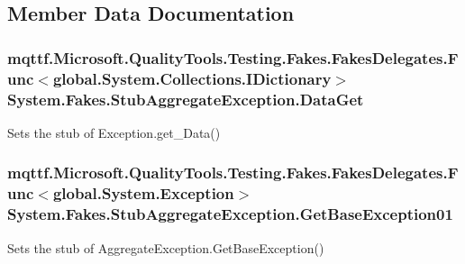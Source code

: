 \subsection{Member Data Documentation}
\hypertarget{class_system_1_1_fakes_1_1_stub_aggregate_exception_ada4753fbcadff6de5942ac06fb9a1e48}{
\subsubsection[{Data\-Get}]{\setlength{\rightskip}{0pt plus 5cm}mqttf.\-Microsoft.\-Quality\-Tools.\-Testing.\-Fakes.\-Fakes\-Delegates.\-Func$<$global.\-System.\-Collections.\-I\-Dictionary$>$ System.\-Fakes.\-Stub\-Aggregate\-Exception.\-Data\-Get}}\label{class_system_1_1_fakes_1_1_stub_aggregate_exception_ada4753fbcadff6de5942ac06fb9a1e48}


Sets the stub of Exception.\-get\-\_\-\-Data()

\hypertarget{class_system_1_1_fakes_1_1_stub_aggregate_exception_a00c037c9965a75ae298dc835c3827f45}{
\subsubsection[{Get\-Base\-Exception01}]{\setlength{\rightskip}{0pt plus 5cm}mqttf.\-Microsoft.\-Quality\-Tools.\-Testing.\-Fakes.\-Fakes\-Delegates.\-Func$<$global.\-System.\-Exception$>$ System.\-Fakes.\-Stub\-Aggregate\-Exception.\-Get\-Base\-Exception01}}\label{class_system_1_1_fakes_1_1_stub_aggregate_exception_a00c037c9965a75ae298dc835c3827f45}


Sets the stub of Aggregate\-Exception.\-Get\-Base\-Exception()

